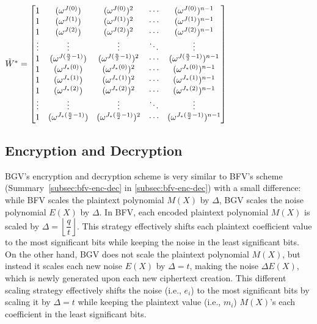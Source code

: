 \begin{tcolorbox}[title={\textbf{\tboxlabel{\ref*{subsec:bgv-encoding-decoding}} BGV's Encoding and Decoding}}]
$\tilde{W}^* = \begin{bmatrix}
1 & (\omega^{J(0)}) & (\omega^{J(0)})^2 & \cdots & (\omega^{J(0)})^{n-1}\\
1 & (\omega^{J(1)}) & (\omega^{J(1)})^2 & \cdots & (\omega^{J(1)})^{n-1}\\
1 & (\omega^{J(2)}) & (\omega^{J(2)})^2 & \cdots & (\omega^{J(2)})^{n-1}\\
\vdots & \vdots & \vdots & \ddots & \vdots \\
1 & (\omega^{J(\frac{n}{2}-1)}) & (\omega^{J(\frac{n}{2}-1)})^2 & \cdots & (\omega^{J(\frac{n}{2}-1)})^{n-1}\\
1 & (\omega^{J_*(0)}) & (\omega^{J_*(0)})^2 & \cdots & (\omega^{J_*(0)})^{n-1}\\
1 & (\omega^{J_*(1)}) & (\omega^{J_*(1)})^2 & \cdots & (\omega^{J_*(1)})^{n-1}\\
1 & (\omega^{J_*(2)}) & (\omega^{J_*(2)})^2 & \cdots & (\omega^{J_*(2)})^{n-1}\\
\vdots & \vdots & \vdots & \ddots & \vdots \\
1 & (\omega^{J_*(\frac{n}{2}-1)}) & (\omega^{J_*(\frac{n}{2}-1)})^2 & \cdots & (\omega^{J_*(\frac{n}{2}-1)})^{n-1}\\
\end{bmatrix}$

\end{tcolorbox}


\subsection{Encryption and Decryption}
\label{subsec:bgv-enc-dec}

BGV's encryption and decryption scheme is very similar to BFV's scheme (Summary~\ref*{subsec:bfv-enc-dec} in \autoref{subsec:bfv-enc-dec}) with a small difference: while BFV scales the plaintext polynomial $M(X)$ by $\Delta$, BGV scales the noise polynomial $E(X)$ by $\Delta$. In BFV, each encoded plaintext polynomial $M(X)$ is scaled by $ \Delta = \left\lfloor \dfrac{q}{t} \right\rfloor$. This strategy effectively shifts each plaintext coefficient value to the most significant bits while keeping the noise in the least significant bits. On the other hand, BGV does not scale the plaintext polynomial $M(X)$, but instead it scales each new noise $E(X)$ by $\Delta = t$, making the noise $\Delta E(X)$, which is newly generated upon each new ciphertext creation. This different scaling strategy effectively shifts the noise (i.e., $e_i$) to the most significant bits by scaling it by $\Delta = t$ while keeping the plaintext value (i.e., $m_i$) $M(X)$'s each coefficient in the least significant bits. 

